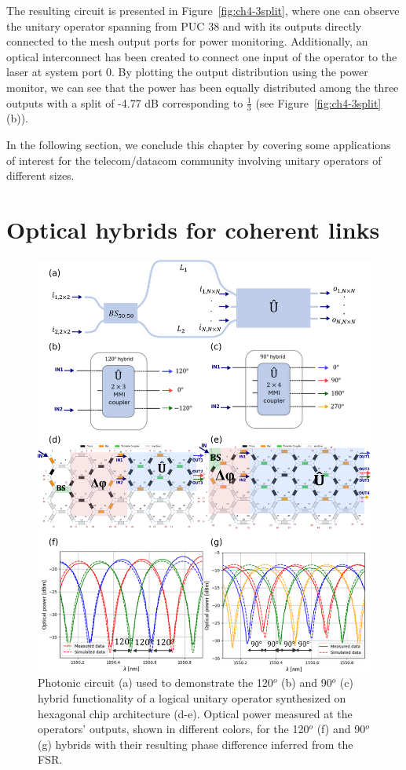The resulting circuit is presented in Figure~\ref{fig:ch4-3split}, where one can observe the unitary operator spanning from PUC 38 and with its outputs directly connected to the mesh output ports for power monitoring.
Additionally, an optical interconnect has been created to connect one input of the operator to the laser at system port 0.
By plotting the output distribution using the power monitor, we can see that the power has been equally distributed among the three outputs with a split of -4.77 dB corresponding to \(\frac{1}{3}\) (see Figure~\ref{fig:ch4-3split}(b)).

In the following section, we conclude this chapter by covering some applications of interest for the telecom/datacom community involving unitary operators of different sizes.
\section{Optical hybrids for coherent links}
\begin{figure}[t!]
	\centering
	\includegraphics{figures/ch4-hybrids.pdf}
	\caption{Photonic circuit (a) used to demonstrate the 120$^o$ (b) and 90$^o$ (c) hybrid functionality of a logical unitary operator synthesized on hexagonal chip architecture (d-e).
		Optical power measured at the operators' outputs, shown in different colors, for the 120$^o$ (f) and 90$^o$ (g) hybrids with their resulting phase difference inferred from the FSR.
	}
	\label{fig:hybrids}
\end{figure}

